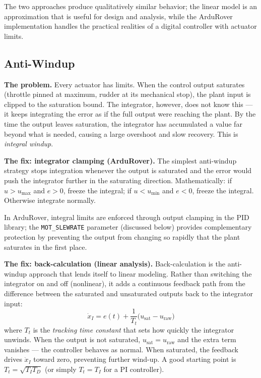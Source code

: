 \documentclass[12pt]{article}
\begin{document}
The two approaches produce qualitatively similar behavior; the linear model
is an approximation that is useful for design and analysis, while the ArduRover
implementation handles the practical realities of a digital controller with
actuator limits.

\subsection{Anti-Windup}

\textbf{The problem.}  Every actuator has limits.  When the control output
saturates (throttle pinned at maximum, rudder at its mechanical stop), the
plant input is clipped to the saturation bound.  The integrator, however,
does not know this --- it keeps integrating the error as if the full output
were reaching the plant.  By the time the output leaves saturation, the
integrator has accumulated a value far beyond what is needed, causing a
large overshoot and slow recovery.  This is \emph{integral windup}.

\textbf{The fix: integrator clamping (ArduRover).}
The simplest anti-windup strategy stops integration whenever the output is
saturated and the error would push the integrator further in the saturating
direction.  Mathematically: if $u > u_\mathrm{max}$ and $e > 0$, freeze the
integral; if $u < u_\mathrm{min}$ and $e < 0$, freeze the integral.
Otherwise integrate normally.


In ArduRover, integral limits are enforced through output clamping in the PID
library; the \texttt{MOT\_SLEWRATE} parameter (discussed below) provides
complementary protection by preventing the output from changing so rapidly
that the plant saturates in the first place.

\textbf{The fix: back-calculation (linear analysis).}
Back-calculation is the anti-windup approach that lends itself to linear
modeling.  Rather than switching the integrator on and off (nonlinear), it
adds a continuous feedback path from the difference between the saturated
and unsaturated outputs back to the integrator input:
\begin{equation}
  \dot{x}_I = e(t) + \frac{1}{T_t}\bigl(u_\mathrm{sat} - u_\mathrm{raw}\bigr)
  \label{eq:backcalc}
\end{equation}
where $T_t$ is the \emph{tracking time constant} that sets how quickly the
integrator unwinds.  When the output is not saturated, $u_\mathrm{sat} =
u_\mathrm{raw}$ and the extra term vanishes --- the controller behaves as
normal.  When saturated, the feedback drives $\dot{x}_I$ toward zero,
preventing further wind-up.  A good starting point is $T_t = \sqrt{T_I T_D}$
(or simply $T_t = T_I$ for a PI controller).
\end{document}
